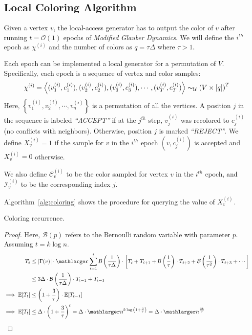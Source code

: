 \subsection{Local Coloring Algorithm}%
\label{sub:local_coloring_algortihm}



Given a vertex $v$, the local-access generator has to output the color of $v$
after running $t = \mathcal O(1)$ epochs of \emph{Modified Glauber Dynamics}.
We will define the $i^{th}$ epoch as $\chi^{(i)}$ and the number of colors as $q = \tau\Delta$ where $\tau > 1$.

Each epoch can be implemented a local generator for a permutation of $V$.
Specifically, each epoch is a sequence of vertex and color samples:
\[
\chi^{(i)}
= \left\langle (v^{(i)}_1, c^{(i)}_1), (v^{(i)}_2, c^{(i)}_2), (v^{(i)}_3, c^{(i)}_3), \cdots, (v^{(i)}_T, c^{(i)}_T)\right\rangle
\thicksim_{\mathcal U} \left( V\times [q]\right)^T
\]
Here, $\left\{ v^{(i)}_1, v^{(i)}_2,\cdots, v^{(i)}_n\right\}$ is a permutation of all the vertices.
A position $j$ in the sequence is labeled \emph{``ACCEPT''} if at the $j^{th}$ step,
$v^{(i)}_j$ was recolored to $c^{(i)}_j$ (no conflicts with neighbors).
Otherwise, position $j$ is marked \emph{``REJECT''}.
We define $X^{(i)}_v = 1$ if the sample for $v$ in the $i^{th}$ epoch $(v, c^{(i)}_j)$ is accepted and $X^{(i)}_v = 0$ otherwise.

We also define $\mathcal C^{(i)}_v$ to be the color sampled for vertex $v$ in the $i^{th}$ epoch,
and $\mathcal I^{(i)}_v$ to be the corresponding index $j$.

Algorithm~\ref{alg:coloring} shows the procedure for querying the value of $X^{(i)}_v$.

\begin{theorem}
\label{thm:coloring_recurrence}
Coloring recurrence.
\end{theorem}
\begin{proof}
Here, $\mathcal B(p)$ refers to the Bernoulli random variable with parameter $p$.
Assuming $t = k\log n$.
\begin{align}
T_{t} &\le \left|\Gamma(v)\right| \cdot \mathlarger\sum\limits_{i=1}^{t} \mathcal B\left( \frac{1}{\tau\Delta}\right)\cdot
\left[ T_{i} + T_{i+1} + \mathcal B\left(\frac{1}{\tau}\right)\cdot T_{i+2} + \mathcal B\left(\frac{1}{\tau^2}\right)\cdot T_{i+3} + \cdots\right]\\
&\le 3\Delta \cdot \mathcal B\left(\frac{1}{\tau\Delta}\right)\cdot T_{t-1} + T_{t-1}\\
\implies \mathbb E[T_t] &\le \left( 1 + \frac{3}{\tau}\right)\cdot \mathbb E[T_{t-1}]\\
\implies \mathbb E[T_t] &\le \Delta\cdot \left( 1 + \frac{3}{\tau}\right)^t = \Delta\cdot \mathlarger n^{k\log{\left(1 + \frac{3}{\tau} \right)}}
= \Delta\cdot \mathlarger n^{\frac{3k}{\tau}}
\end{align}
\end{proof}
